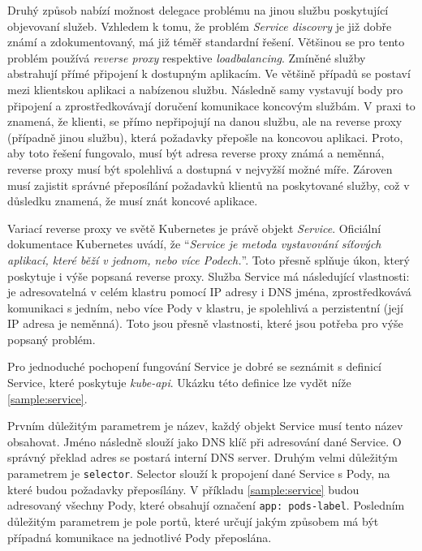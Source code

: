 Druhý způsob nabízí možnost delegace problému na jinou službu poskytující objevovaní služeb. Vzhledem k tomu, že problém \textit{Service discovry} je již dobře známí a zdokumentovaný, má již téměř standardní řešení. Většinou se pro tento problém  používá \textit{reverse proxy} respektive \textit{loadbalancing}. Zmíněné služby abstrahují přímé připojení k dostupným aplikacím. Ve většině případů se postaví mezi klientskou aplikaci a nabízenou službu. Následně samy vystavují body pro připojení a zprostředkovávají doručení komunikace koncovým službám. V praxi to znamená, že klienti, se přímo nepřipojují na danou službu, ale na reverse proxy (případně jinou službu), která požadavky přepošle na koncovou aplikaci. Proto, aby toto řešení fungovalo, musí být adresa reverse proxy známá a neměnná, reverse proxy musí být spolehlivá a dostupná v nejvyžší možné míře. Zároven musí zajistit správné přeposílání požadavků klientů na poskytované služby, což v důsledku znamená, že musí znát koncové aplikace.

Variací reverse proxy ve světě Kubernetes je právě objekt \textit{Service}. Oficiální dokumentace Kubernetes uvádí, že \enquote{\textit{Service je metoda vystavování síťových aplikací, které běží v jednom, nebo více Podech.}}\cite{thekubernetesauthors_2023_service}. Toto přesně splňuje úkon, který poskytuje i výše popsaná reverse proxy. Služba Service má následující vlastnosti: je adresovatelná v celém klastru pomocí IP adresy i DNS jména, zprostředkovává komunikaci s jedním, nebo více Pody v klastru, je spolehlivá a perzistentní (její IP adresa je neměnná). Toto jsou přesně vlastnosti, které jsou potřeba pro výše popsaný problém.

Pro jednoduché pochopení fungování Service je dobré se seznámit s definicí Service, které poskytuje \textit{kube-api}. Ukázku této definice lze vydět níže \ref{sample:service}.


Prvním důležitým parametrem je název, každý objekt Service musí tento název obsahovat. Jméno následně slouží jako DNS klíč při adresování dané Service. O správný překlad adres se postará interní DNS server. Druhým velmi důležitým parametrem je \verb|selector|. Selector slouží k propojení dané Service s Pody, na které budou požadavky přeposílány. V příkladu \ref{sample:service} budou adresovaný všechny Pody, které obsahují označení \verb|app: pods-label|. Posledním důležitým parametrem je pole portů, které určují jakým způsobem má být případná komunikace na jednotlivé Pody přeposlána.

